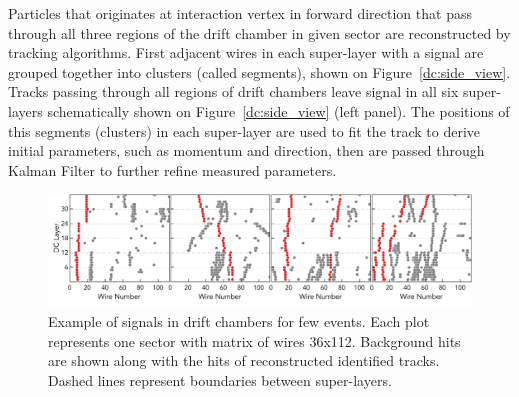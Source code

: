 Particles that originates at interaction vertex in forward direction that pass through all three regions of the drift chamber in given sector are reconstructed by tracking algorithms. First adjacent  wires in each super-layer with a signal are grouped together into clusters (called segments), shown on Figure~\ref{dc:side_view}. Tracks passing through all regions of drift chambers leave signal in all six super-layers schematically shown on Figure~\ref{dc:side_view} (left panel).  The positions of this segments (clusters) in each super-layer are used to fit the track to derive initial parameters, such as momentum and direction, then are passed through Kalman Filter to further refine measured parameters.

\begin{figure}[!ht]
\begin{center}
 \includegraphics[width=6.2in]{images/figure_dc_examples.pdf}
\caption {Example of signals in drift chambers for few events. Each plot represents one sector with matrix of wires 36x112. Background hits are shown along with the hits of reconstructed identified tracks. Dashed lines represent boundaries between super-layers.}
 \label{dc:events_sector}
 \end{center}
\end{figure}


